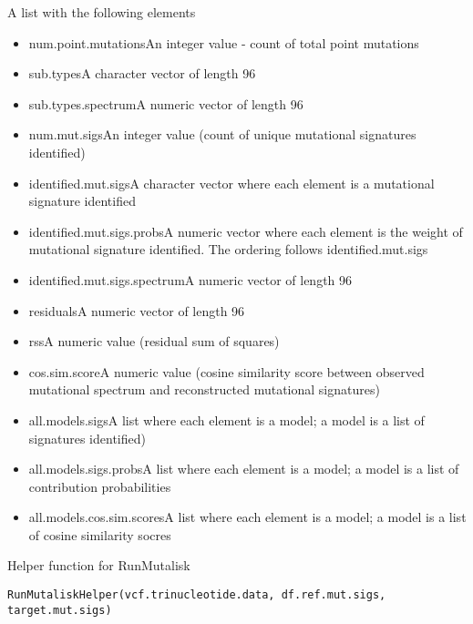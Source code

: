 \documentclass[letterpaper]{book}
\begin{document}
%
\begin{Value}
A list with the following elements
\begin{itemize}

\item{} num.point.mutationsAn integer value - count of total point mutations
\item{} sub.typesA character vector of length 96
\item{} sub.types.spectrumA numeric vector of length 96
\item{} num.mut.sigsAn integer value (count of unique mutational signatures identified)
\item{} identified.mut.sigsA character vector where each element is a mutational signature identified
\item{} identified.mut.sigs.probsA numeric vector where each element is the weight of mutational signature identified.
The ordering follows identified.mut.sigs
\item{} identified.mut.sigs.spectrumA numeric vector of length 96
\item{} residualsA numeric vector of length 96
\item{} rssA numeric value (residual sum of squares)
\item{} cos.sim.scoreA numeric value (cosine similarity score between observed mutational spectrum and
reconstructed mutational signatures)
\item{} all.models.sigsA list where each element is a model; a model is a list of signatures identified)
\item{} all.models.sigs.probsA list where each element is a model; a model is a list of contribution probabilities
\item{} all.models.cos.sim.scoresA list where each element is a model; a model is a list of cosine similarity socres

\end{itemize}

\end{Value}
%
\begin{Description}\relax
Helper function for RunMutalisk
\end{Description}
%
\begin{Usage}
\begin{verbatim}
RunMutaliskHelper(vcf.trinucleotide.data, df.ref.mut.sigs, target.mut.sigs)
\end{verbatim}
\end{Usage}
\end{document}

